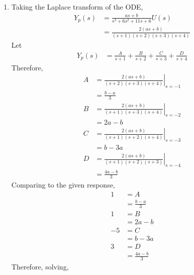 \documentclass[fleqn, a4paper, 11pt, oneside]{amsart}
\theoremstyle{definition}
\theoremstyle{theorem}
\begin{document}
\begin{solution}
\begin{enumerate}[leftmargin=*]
			\begin{enumerate}[leftmargin=*]
				\item
					Taking the Laplace transform of the ODE,
					\begin{align*}
						Y_p(s) & = \frac{a s + b}{s^3 + 6 s^2 + 11 s + 6} U(s) \\
                               & = \frac{2 (a s + b)}{(s + 1) (s + 2) (s + 3) (s + 4)}
					\end{align*}
					Let
					\begin{align*}
						Y_p(s) & = \frac{A}{s + 1} + \frac{B}{s + 2} + \frac{C}{s + 3} + \frac{D}{s + 4}
					\end{align*}
					Therefore,
					\begin{align*}
						A & = \left. \frac{2 (a s + b)}{(s + 2) (s + 3) (s + 4)} \right|_{s = -1} \\
                          & = \frac{b - a}{3}                                                     \\
						B & = \left. \frac{2 (a s + b)}{(s + 1) (s + 3) (s + 4)} \right|_{s = -2} \\
                          & = 2 a - b                                                             \\
						C & = \left. \frac{2 (a s + b)}{(s + 1) (s + 2) (s + 4)} \right|_{s = -3} \\
                          & = b - 3 a                                                             \\
						D & = \left. \frac{2 (a s + b)}{(s + 1) (s + 2) (s + 3)} \right|_{s = -4} \\
                          & = \frac{4 a - b}{3}
					\end{align*}
					Comparing to the given response,
					\begin{align*}
						1  & = A               \\
                           & = \frac{b - a}{3} \\
						1  & = B               \\
                           & = 2 a - b         \\
						-5 & = C               \\
                           & = b - 3 a         \\
						3  & = D               \\
                           & = \frac{4 a - b}{3}
					\end{align*}
					Therefore, solving,
					\begin{align*}

\end{align*}
\end{enumerate}
\end{enumerate}
\end{solution}
\end{document}
